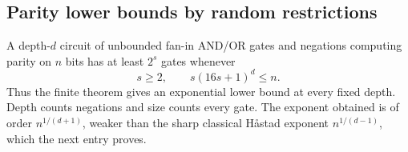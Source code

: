\begin{result}
\subsection{Parity lower bounds by random restrictions}
A depth-$d$ circuit of unbounded fan-in AND/OR gates and negations computing
parity on $n$ bits has at least $2^s$ gates whenever
\[
s\ge2,\qquad s(16s+1)^d\le n.
\]
Thus the finite theorem gives an exponential lower bound at every fixed depth.
Depth counts negations and size counts every gate. The exponent obtained is of
order $n^{1/(d+1)}$, weaker than the sharp classical H\aa stad exponent
$n^{1/(d-1)}$, which the next entry proves.\citep{FurstSaxeSipser1984,Ajtai1983,Hastad1986}
\end{result}

